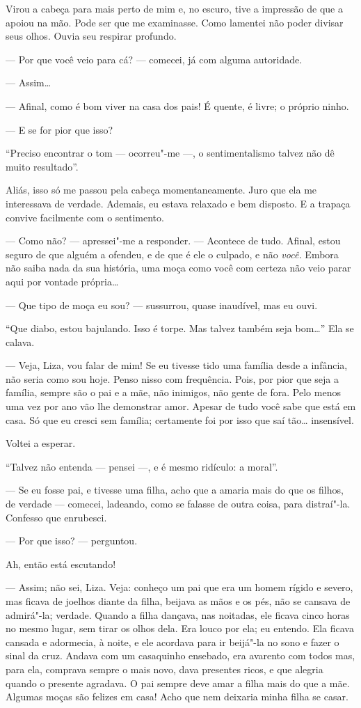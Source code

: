 Virou a cabeça para mais perto de mim e, no escuro, tive a impressão de
que a apoiou na mão. Pode ser que me examinasse. Como lamentei não poder
divisar seus olhos. Ouvia seu respirar profundo.

--- Por que você veio para cá? --- comecei, já com alguma autoridade.

--- Assim\ldots{}

--- Afinal, como é bom viver na casa dos pais! É quente, é livre; o
próprio ninho.

--- E se for pior que isso?

``Preciso encontrar o tom --- ocorreu"-me ---, o sentimentalismo talvez não
dê muito resultado''.

Aliás, isso só me passou pela cabeça momentaneamente. Juro que ela me
interessava de verdade. Ademais, eu estava relaxado e bem disposto. E a
trapaça convive facilmente com o sentimento.

--- Como não? --- apressei"-me a responder. --- Acontece de tudo. Afinal, estou
seguro de que alguém a ofendeu, e de que é ele o culpado, e não
\emph{você.} Embora não saiba nada da sua história, uma moça como você
com certeza não veio parar aqui por vontade própria\ldots{}

--- Que tipo de moça eu sou? --- sussurrou, quase inaudível, mas eu ouvi.

``Que diabo, estou bajulando. Isso é torpe. Mas talvez também seja
bom\ldots{}'' Ela se calava.

--- Veja, Liza, vou falar de mim! Se eu tivesse tido uma família desde a
infância, não seria como sou hoje. Penso nisso com frequência. Pois, por
pior que seja a família, sempre são o pai e a mãe, não inimigos, não
gente de fora. Pelo menos uma vez por ano vão lhe demonstrar amor.
Apesar de tudo você sabe que está em casa. Só que eu cresci sem família;
certamente foi por isso que saí tão\ldots{} insensível.

Voltei a esperar.

``Talvez não entenda --- pensei ---, e é mesmo ridículo: a moral''.

--- Se eu fosse pai, e tivesse uma filha, acho que a amaria mais do que os
filhos, de verdade --- comecei, ladeando, como se falasse de outra coisa,
para distraí"-la. Confesso que enrubesci.

--- Por que isso? --- perguntou.

Ah, então está escutando!

--- Assim; não sei, Liza. Veja: conheço um pai que era um homem rígido e
severo, mas ficava de joelhos diante da filha, beijava as mãos e os pés,
não se cansava de admirá"-la; verdade. Quando a filha dançava, nas
noitadas, ele ficava cinco horas no mesmo lugar, sem tirar os olhos
dela. Era louco por ela; eu entendo. Ela ficava cansada e adormecia, à
noite, e ele acordava para ir beijá"-la no sono e fazer o sinal da cruz.
Andava com um casaquinho ensebado, era avarento com todos mas, para ela,
comprava sempre o mais novo, dava presentes ricos, e que alegria quando
o presente agradava. O pai sempre deve amar a filha mais do que a mãe.
Algumas moças são felizes em casa! Acho que nem deixaria minha filha se
casar.

